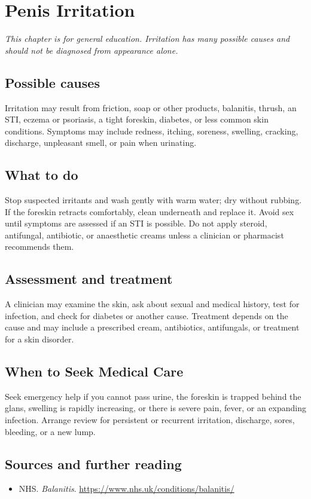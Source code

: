 \chapter{Penis Irritation}

\medskip
\noindent\textit{This chapter is for general education. Irritation has many possible causes and should not be diagnosed from appearance alone.}

\section*{Possible causes}
Irritation may result from friction, soap or other products, balanitis, thrush, an STI, eczema or psoriasis, a tight foreskin, diabetes, or less common skin conditions. Symptoms may include redness, itching, soreness, swelling, cracking, discharge, unpleasant smell, or pain when urinating.

\section*{What to do}
Stop suspected irritants and wash gently with warm water; dry without rubbing. If the foreskin retracts comfortably, clean underneath and replace it. Avoid sex until symptoms are assessed if an STI is possible. Do not apply steroid, antifungal, antibiotic, or anaesthetic creams unless a clinician or pharmacist recommends them.

\section*{Assessment and treatment}
A clinician may examine the skin, ask about sexual and medical history, test for infection, and check for diabetes or another cause. Treatment depends on the cause and may include a prescribed cream, antibiotics, antifungals, or treatment for a skin disorder.

\section*{When to Seek Medical Care}
Seek emergency help if you cannot pass urine, the foreskin is trapped behind the glans, swelling is rapidly increasing, or there is severe pain, fever, or an expanding infection. Arrange review for persistent or recurrent irritation, discharge, sores, bleeding, or a new lump.

\section*{Sources and further reading}
\begin{itemize}
\item NHS. \textit{Balanitis}. \url{https://www.nhs.uk/conditions/balanitis/}
\end{itemize}
